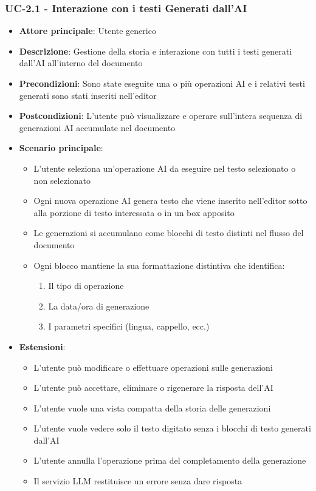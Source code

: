 \documentclass[11pt,a4paper]{article}
\begin{document}
\subsubsection{UC-2.1 - Interazione con i testi Generati dall’AI}
\begin{itemize}
    \item \textbf{Attore principale}: Utente generico
    \item \textbf{Descrizione}: Gestione della storia e interazione con tutti i testi generati dall’AI all’interno del documento
    \item \textbf{Precondizioni}: Sono state eseguite una o più operazioni AI e i relativi testi generati sono stati inseriti nell’editor
    \item \textbf{Postcondizioni}: L’utente può visualizzare e operare sull’intera sequenza di generazioni AI accumulate nel documento
    \item \textbf{Scenario principale}:
    \begin{itemize}
        \item L’utente seleziona un’operazione AI da eseguire nel testo selezionato o non selezionato
        \item Ogni nuova operazione AI genera testo che viene inserito nell’editor sotto alla porzione di testo interessata o in un box apposito
        \item Le generazioni si accumulano come blocchi di testo distinti nel flusso del documento
        \item Ogni blocco mantiene la sua formattazione distintiva che identifica:
            \begin{enumerate}
                \item Il tipo di operazione
                \item La data/ora di generazione
                \item I parametri specifici (lingua, cappello, ecc.)
            \end{enumerate}
    \end{itemize}
    \item \textbf{Estensioni}:
    \begin{itemize}
        \item L’utente può modificare o effettuare operazioni sulle generazioni
        \item L’utente può accettare, eliminare o rigenerare la risposta dell’AI
        \item L’utente vuole una vista compatta della storia delle generazioni
        \item L’utente vuole vedere solo il testo digitato senza i blocchi di testo generati dall’AI
        \item L’utente annulla l’operazione prima del completamento della generazione
        \item Il servizio LLM restituisce un errore senza dare risposta
    \end{itemize}
\end{itemize}
\end{document}
